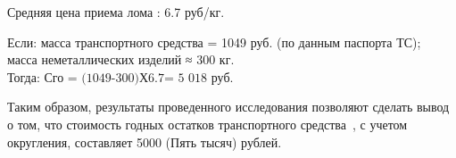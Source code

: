 Средняя цена приема  лома :	 		6.7 руб/кг.

 
\noindent Если:
масса транспортного средства = 1049 руб. (по данным паспорта ТС);\\
\indent масса неметаллических изделий  ≈ 300 кг. \\
Тогда:  $ \text{Сго = (1049-300)Х6.7= 5 018} $ руб.

\par Таким образом, результаты проведенного  исследования позволяют сделать вывод о том, что стоимость годных остатков транспортного средства \,, с учетом округления,   составляет 5000 (Пять тысяч) рублей.\\



